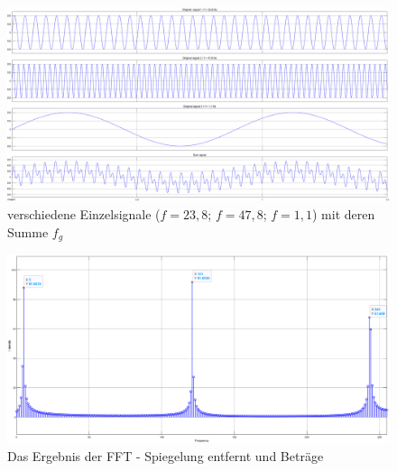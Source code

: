 \begin{figure}
	\centering
	\includegraphics[width=\linewidth]{Bilder/Testsignal_AllViews.png} %
	\caption{verschiedene Einzelsignale ($f=23,8$; $f=47,8$; $f=1,1$) mit deren Summe $f_g$}
	\label{fig:Testsignal_AllViews}
\end{figure}

\begin{figure}
	\centering 
	\includegraphics[width=\linewidth]{Bilder/FFT_Ergebnis_Skala_512.png} %
	\caption{Das Ergebnis der FFT - Spiegelung entfernt und Beträge}
	\label{fig:FFT_Ergebnis_Skala_512}
\end{figure}


